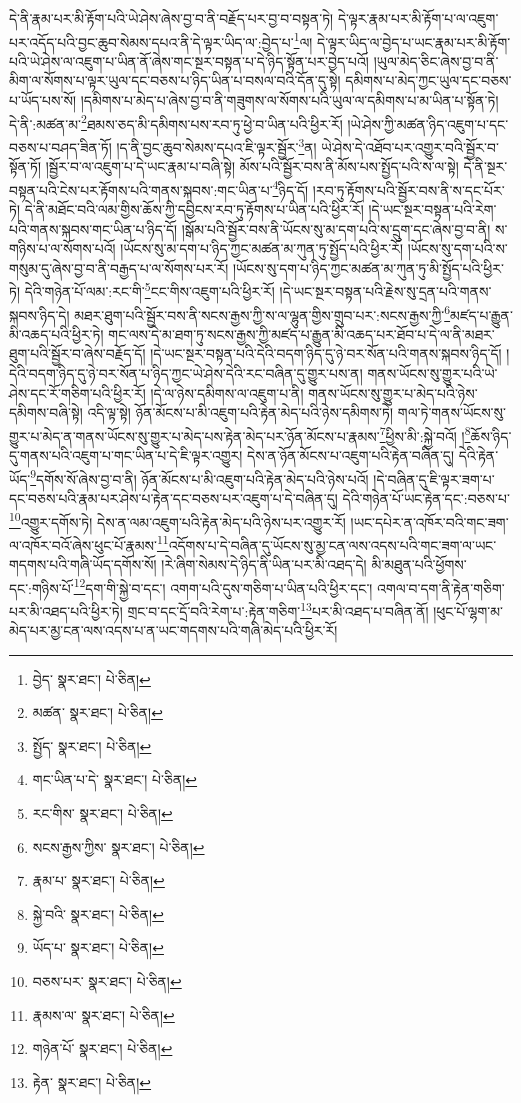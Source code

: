 དེ་ནི་རྣམ་པར་མི་རྟོག་པའི་ཡེ་ཤེས་ཞེས་བྱ་བ་ནི་བརྗོད་པར་བྱ་བ་བསྟན་ཏེ། དེ་ལྟར་རྣམ་པར་མི་རྟོག་པ་ལ་འཇུག་པར་འདོད་པའི་བྱང་ཆུབ་སེམས་དཔའ་ནི་དེ་ལྟར་ཡིད་ལ་:བྱེད་པ་\footnote{བྱེད་  སྣར་ཐང་།  པེ་ཅིན། }ལ། དེ་ལྟར་ཡིད་ལ་བྱེད་པ་ཡང་རྣམ་པར་མི་རྟོག་པའི་ཡེ་ཤེས་ལ་འཇུག་པ་ཡིན་ནོ་ཞེས་གང་སྔར་བསྟན་པ་དེ་ཉིད་སྟོན་པར་བྱེད་པའོ། །ཡུལ་མེད་ཅིང་ཞེས་བྱ་བ་ནི་མིག་ལ་སོགས་པ་ལྟར་ཡུལ་དང་བཅས་པ་ཉིད་ཡིན་པ་བསལ་བའི་དོན་དུ་སྟེ། དམིགས་པ་མེད་ཀྱང་ཡུལ་དང་བཅས་པ་ཡོད་པས་སོ། །དམིགས་པ་མེད་པ་ཞེས་བྱ་བ་ནི་གཟུགས་ལ་སོགས་པའི་ཡུལ་ལ་དམིགས་པ་མ་ཡིན་པ་སྟོན་ཏེ། དེ་ནི་:མཚན་མ་\footnote{མཚན་  སྣར་ཐང་།  པེ་ཅིན། }ཐམས་ཅད་མི་དམིགས་པས་རབ་ཏུ་ཕྱེ་བ་ཡིན་པའི་ཕྱིར་རོ། །ཡེ་ཤེས་ཀྱི་མཚན་ཉིད་འཇུག་པ་དང་བཅས་པ་བཤད་ཟིན་ཏོ། །ད་ནི་བྱང་ཆུབ་སེམས་དཔའ་ཇི་ལྟར་སྦྱོར་\footnote{སྤྱོད་  སྣར་ཐང་།  པེ་ཅིན། }ན། ཡེ་ཤེས་དེ་འཐོབ་པར་འགྱུར་བའི་སྦྱོར་བ་སྟོན་ཏོ། །སྦྱོར་བ་ལ་འཇུག་པ་དེ་ཡང་རྣམ་པ་བཞི་སྟེ། མོས་པའི་སྦྱོར་བས་ནི་མོས་པས་སྤྱོད་པའི་ས་ལ་སྟེ། དེ་ནི་སྔར་བསྟན་པའི་ངེས་པར་རྟོགས་པའི་གནས་སྐབས་:གང་ཡིན་པ་\footnote{གང་ཡིན་པ་དེ་  སྣར་ཐང་།  པེ་ཅིན། }ཉིད་དོ། །རབ་ཏུ་རྟོགས་པའི་སྦྱོར་བས་ནི་ས་དང་པོར་ཏེ། དེ་ནི་མཐོང་བའི་ལམ་གྱིས་ཆོས་ཀྱི་དབྱིངས་རབ་ཏུ་རྟོགས་པ་ཡིན་པའི་ཕྱིར་རོ། །དེ་ཡང་སྔར་བསྟན་པའི་རེག་པའི་གནས་སྐབས་གང་ཡིན་པ་ཉིད་དོ། །སྒོམ་པའི་སྦྱོར་བས་ནི་ཡོངས་སུ་མ་དག་པའི་ས་དྲུག་དང་ཞེས་བྱ་བ་ནི། ས་གཉིས་པ་ལ་སོགས་པའོ། །ཡོངས་སུ་མ་དག་པ་ཉིད་ཀྱང་མཚན་མ་ཀུན་ཏུ་སྤྱོད་པའི་ཕྱིར་རོ། །ཡོངས་སུ་དག་པའི་ས་གསུམ་དུ་ཞེས་བྱ་བ་ནི་བརྒྱད་པ་ལ་སོགས་པར་རོ། །ཡོངས་སུ་དག་པ་ཉིད་ཀྱང་མཚན་མ་ཀུན་ཏུ་མི་སྤྱོད་པའི་ཕྱིར་ཏེ། དེའི་གཉེན་པོ་ལམ་:རང་གི་\footnote{རང་གིས་  སྣར་ཐང་།  པེ་ཅིན། }ངང་གིས་འཇུག་པའི་ཕྱིར་རོ། །དེ་ཡང་སྔར་བསྟན་པའི་རྗེས་སུ་དྲན་པའི་གནས་སྐབས་ཉིད་དེ། མཐར་ཐུག་པའི་སྦྱོར་བས་ནི་སངས་རྒྱས་ཀྱི་ས་ལ་ལྷུན་གྱིས་གྲུབ་པར་:སངས་རྒྱས་ཀྱི་\footnote{སངས་རྒྱས་ཀྱིས་  སྣར་ཐང་།  པེ་ཅིན། }མཛད་པ་རྒྱུན་མི་འཆད་པའི་ཕྱིར་ཏེ། གང་ལས་དེ་མ་ཐག་ཏུ་སངས་རྒྱས་ཀྱི་མཛད་པ་རྒྱུན་མི་འཆད་པར་ཐོབ་པ་དེ་ལ་ནི་མཐར་ཐུག་པའི་སྦྱོར་བ་ཞེས་བརྗོད་དོ། །དེ་ཡང་སྔར་བསྟན་པའི་དེའི་བདག་ཉིད་དུ་ཉེ་བར་སོན་པའི་གནས་སྐབས་ཉིད་དོ། །དེའི་བདག་ཉིད་དུ་ཉེ་བར་སོན་པ་ཉིད་ཀྱང་ཡེ་ཤེས་དེའི་རང་བཞིན་དུ་གྱུར་པས་ན། གནས་ཡོངས་སུ་གྱུར་པའི་ཡེ་ཤེས་དང་རོ་གཅིག་པའི་ཕྱིར་རོ། །དེ་ལ་ཉེས་དམིགས་ལ་འཇུག་པ་ནི། གནས་ཡོངས་སུ་གྱུར་པ་མེད་པའི་ཉེས་དམིགས་བཞི་སྟེ། འདི་ལྟ་སྟེ། ཉོན་མོངས་པ་མི་འཇུག་པའི་རྟེན་མེད་པའི་ཉེས་དམིགས་ཏེ། གལ་ཏེ་གནས་ཡོངས་སུ་གྱུར་པ་མེད་ན་གནས་ཡོངས་སུ་གྱུར་པ་མེད་པས་རྟེན་མེད་པར་ཉོན་མོངས་པ་རྣམས་\footnote{རྣམ་པ་  སྣར་ཐང་།  པེ་ཅིན། }ཕྱིས་མི་:སྐྱེ་བའོ། །\footnote{སྐྱེ་བའི་  སྣར་ཐང་།  པེ་ཅིན། }ཆོས་ཉིད་དུ་གནས་པའི་འཇུག་པ་གང་ཡིན་པ་དེ་ཇི་ལྟར་འགྱུར། དེས་ན་ཉོན་མོངས་པ་འཇུག་པའི་རྟེན་བཞིན་དུ། དེའི་རྟེན་ཡོད་\footnote{ཡོད་པ་  སྣར་ཐང་།  པེ་ཅིན། }དགོས་སོ་ཞེས་བྱ་བ་ནི། ཉོན་མོངས་པ་མི་འཇུག་པའི་རྟེན་མེད་པའི་ཉེས་པའོ། །དེ་བཞིན་དུ་ཇི་ལྟར་ཟག་པ་དང་བཅས་པའི་རྣམ་པར་ཤེས་པ་རྟེན་དང་བཅས་པར་འཇུག་པ་དེ་བཞིན་དུ། དེའི་གཉེན་པོ་ཡང་རྟེན་དང་:བཅས་པ་\footnote{བཅས་པར་  སྣར་ཐང་།  པེ་ཅིན། }འགྱུར་དགོས་ཏེ། དེས་ན་ལམ་འཇུག་པའི་རྟེན་མེད་པའི་ཉེས་པར་འགྱུར་རོ། །ཡང་དཔེར་ན་འཁོར་བའི་གང་ཟག་ལ་འཁོར་བའོ་ཞེས་ཕུང་པོ་རྣམས་\footnote{རྣམས་ལ་  སྣར་ཐང་།  པེ་ཅིན། }འདོགས་པ་དེ་བཞིན་དུ་ཡོངས་སུ་མྱ་ངན་ལས་འདས་པའི་གང་ཟག་ལ་ཡང་གདགས་པའི་གཞི་ཡོད་དགོས་སོ། །རེ་ཞིག་སེམས་དེ་ཉིད་ནི་ཡིན་པར་མི་འཐད་དེ། མི་མཐུན་པའི་ཕྱོགས་དང་:གཉིས་པོ་\footnote{གཉེན་པོ་  སྣར་ཐང་།  པེ་ཅིན། }དག་གི་སྐྱེ་བ་དང་། འགག་པའི་དུས་གཅིག་པ་ཡིན་པའི་ཕྱིར་དང་། འགལ་བ་དག་ནི་རྟེན་གཅིག་པར་མི་འཐད་པའི་ཕྱིར་ཏེ། གྲང་བ་དང་དྲོ་བའི་རེག་པ་:རྟེན་གཅིག་\footnote{རྟེན་  སྣར་ཐང་།  པེ་ཅིན། }པར་མི་འཐད་པ་བཞིན་ནོ། །ཕུང་པོ་ལྷག་མ་མེད་པར་མྱ་ངན་ལས་འདས་པ་ན་ཡང་གདགས་པའི་གཞི་མེད་པའི་ཕྱིར་རོ། 